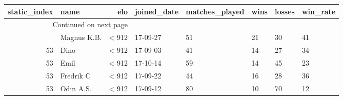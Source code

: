 \begin{longtable}{|r|l|r|l|l|l|l|l|}
\toprule
 static\_index &         name &    elo & joined\_date &  matches\_played &  wins &  losses &  win\_rate \\
\midrule
\endhead
\midrule
\multicolumn{3}{r}{{Continued on next page}} \\
\midrule
\endfoot

\bottomrule
\endlastfoot
           53 &  Magnus K.B. &  < 912 &    17-09-27 &              51 &    21 &      30 &        41 \\
           53 &         Dino &  < 912 &    17-09-03 &              41 &    14 &      27 &        34 \\
           53 &         Emil &  < 912 &    17-10-14 &              59 &    14 &      45 &        23 \\
           53 &    Fredrik C &  < 912 &    17-09-22 &              44 &    16 &      28 &        36 \\
           53 &    Odin A.S. &  < 912 &    17-09-12 &              80 &    10 &      70 &        12 \\
\end{longtable}
